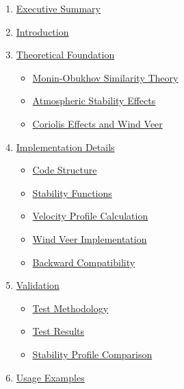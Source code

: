 \documentclass{article}
\begin{document}
\begin{enumerate}[label=\arabic*.]
\item
  \protect\hyperlink{executive-summary}{Executive Summary}
\item
  \protect\hyperlink{introduction}{Introduction}
\item
  \protect\hyperlink{theoretical-foundation}{Theoretical Foundation}

  \begin{itemize}[label=\textbullet]
  \item
    \protect\hyperlink{monin-obukhov-similarity-theory}{Monin-Obukhov
    Similarity Theory}
  \item
    \protect\hyperlink{atmospheric-stability-effects}{Atmospheric
    Stability Effects}
  \item
    \protect\hyperlink{coriolis-effects-and-wind-veer}{Coriolis Effects
    and Wind Veer}
  \end{itemize}
\item
  \protect\hyperlink{implementation-details}{Implementation Details}

  \begin{itemize}[label=\textbullet]
  \item
    \protect\hyperlink{code-structure}{Code Structure}
  \item
    \protect\hyperlink{stability-functions}{Stability Functions}
  \item
    \protect\hyperlink{velocity-profile-calculation}{Velocity Profile
    Calculation}
  \item
    \protect\hyperlink{wind-veer-implementation}{Wind Veer
    Implementation}
  \item
    \protect\hyperlink{backward-compatibility}{Backward Compatibility}
  \end{itemize}
\item
  \protect\hyperlink{validation}{Validation}

  \begin{itemize}[label=\textbullet]
  \item
    \protect\hyperlink{test-methodology}{Test Methodology}
  \item
    \protect\hyperlink{test-results}{Test Results}
  \item
    \protect\hyperlink{stability-profile-comparison}{Stability Profile
    Comparison}
  \end{itemize}
\item
  \protect\hyperlink{usage-examples}{Usage Examples}


\end{enumerate}
\end{document}
